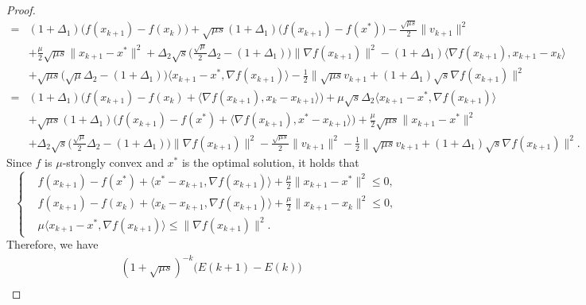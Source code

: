 \documentclass[11pt]{article}
\newcommand{\1}{\mathbf 1}
\numberwithin{equation}{section}
\begin{document}
\begin{proof}
{\begin{align*}
    =&(1+\Delta_1)\big(f(x_{k+1})-f(x_k)\big)+\sqrt{\mu s}(1+\Delta_1)\big(f(x_{k+1})-f(x^*)\big)-\frac{\sqrt{\mu s}}{2}\|v_{k+1}\|^2\\
            &+\frac{\mu}{2}\sqrt{\mu s}\|x_{k+1}-x^*\|^2+\Delta_2\sqrt{s}\big(\frac{\sqrt{\mu}}{2}\Delta_2-(1+\Delta_1)\big)\|\nabla f(x_{k+1})\|^2-(1+\Delta_1)\langle \nabla f(x_{k+1}),x_{k+1}-x_{k}\rangle\\
            &+\sqrt{\mu s}\big(\sqrt{\mu}\Delta_2-(1+\Delta_1)\big)\langle x_{k+1}-x^*, \nabla f(x_{k+1})\rangle -\frac{1}{2}\|\sqrt{\mu s}v_{k+1}+(1+\Delta_1)\sqrt{s}\nabla f(x_{k+1})\|^2 \\
    =&(1+\Delta_1)\big(f(x_{k+1})-f(x_k)+\langle \nabla f(x_{k+1}),x_k-x_{k+1} \rangle \big) + \mu\sqrt{s}\Delta_2\langle x_{k+1}-x^*,\nabla f(x_{k+1})\rangle  \\
    & +\sqrt{\mu s}(1+\Delta_1)\big(f(x_{k+1})-f(x^*)+\langle \nabla f(x_{k+1}), x^*-x_{k+1}\rangle \big) +\frac{\mu}{2}\sqrt{\mu s}\|x_{k+1}-x^*\|^2 \\
    & +\Delta_2\sqrt{s}\big(\frac{\sqrt{\mu}}{2}\Delta_2-(1+\Delta_1)\big)\|\nabla f(x_{k+1})\|^2 - \frac{\sqrt{\mu s}}{2}\|v_{k+1}\|^2-\frac{1}{2}\|\sqrt{\mu s}v_{k+1}+(1+\Delta_1)\sqrt{s}\nabla f(x_{k+1})\|^2.
\end{align*}
}
{Since $f$ is $\mu$-strongly convex and $x^*$ is the optimal solution, it holds that}
    \begin{equation*}
        \left\{
        \begin{aligned}
            & f(x_{k+1})-f(x^*)+\langle x^*-x_{k+1},\nabla f(x_{k+1})\rangle+\frac{\mu}{2}\|x_{k+1}-x^*\|^2\leqslant 0,\\
            & f(x_{k+1})-f(x_k)+\langle x_k-x_{k+1},\nabla f(x_{k+1})\rangle +\frac{\mu}{2}\|x_{k+1}-x_k\|^2\leqslant 0,\\
            & \mu \langle x_{k+1}-x^*, \nabla f(x_{k+1}) \rangle \leqslant \|\nabla f(x_{k+1})\|^2.
        \end{aligned}
        \right.
    \end{equation*}
   {Therefore,  we have
    \begin{equation*}
        \begin{aligned}
            &(1+\sqrt{\mu s})^{-k}\big(E(k+1)-E(k)\big)\\

\end{aligned}
\end{equation*}}
\end{proof}
\end{document}
